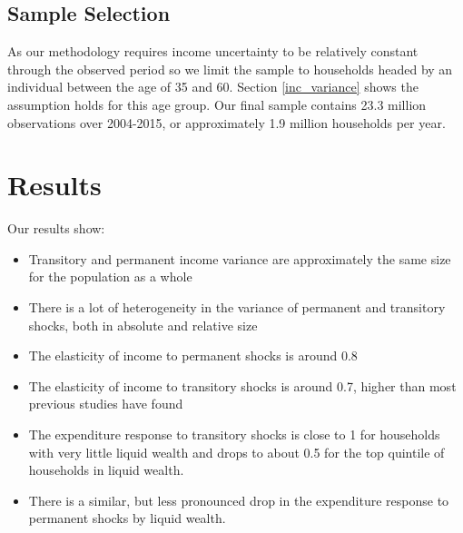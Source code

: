 \documentclass[titlepage]{\econtex}\newcommand{\texname}{IncomeUncertainty}
\begin{document}
\subsection{Sample Selection}
As our methodology requires income uncertainty to be relatively constant through the observed period so we limit the sample to households headed by an individual between the age of 35 and 60. Section \ref{inc_variance} shows the assumption holds for this age group. Our final sample contains 23.3 million observations over 2004-2015, or approximately 1.9 million households per year.

\section{Results} \label{results}
Our results show:
\begin{itemize}
	\item Transitory and permanent income variance are approximately the same size for the population as a whole
	\item There is a lot of heterogeneity in the variance of permanent and transitory shocks, both in absolute and relative size
	\item The elasticity of income to permanent shocks is around 0.8
	\item The elasticity of income to transitory shocks is around 0.7, higher than most previous studies have found
	\item The expenditure response to transitory shocks is close to 1 for households with very little liquid wealth and drops to about 0.5 for the top quintile of households in liquid wealth.
	\item There is a similar, but less pronounced drop in the expenditure response to permanent shocks by liquid wealth.
\end{itemize}
\end{document}
